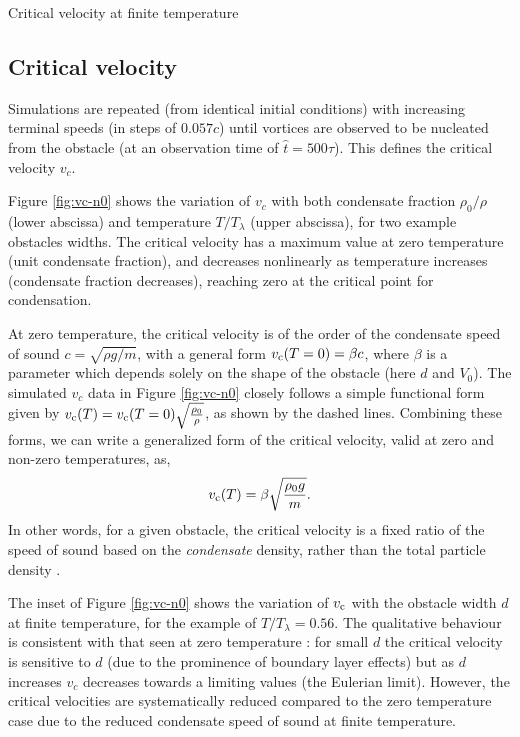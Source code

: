 \begin{chapter}{\label{cha:nonequib}Critical velocity at finite temperature}
  
\subsection{Critical velocity \label{sec:vc}}
Simulations are repeated (from identical initial conditions) with increasing terminal speeds (in steps of $0.057c$) until vortices are observed to be nucleated from the obstacle (at an observation time of $\hat{t}=500\tau$). This defines the critical velocity $v_c$.  



Figure \ref{fig:vc-n0} shows the variation of $v_c$ with both condensate fraction $\rho_0/\rho$ (lower abscissa) and temperature $T/T_\lambda$ (upper abscissa), for two example obstacles widths.  The critical velocity has a maximum value at zero temperature (unit condensate fraction), and decreases nonlinearly as temperature increases (condensate fraction decreases), reaching zero at the critical point for condensation.  

At zero temperature, the critical velocity is of the order of the condensate speed of sound $c=\sqrt{\rho g/m}$, with a general form $v_{\rm c}(T=0)=\beta c$,
where $\beta$ is a parameter which depends solely on the shape of the obstacle (here $d$ and $V_0$).  The simulated $v_c$ data in Figure \ref{fig:vc-n0} closely follows a simple functional form given by $v_{\rm c}(T) = v_{\rm c}(T=0) \sqrt{\frac{\rho_0}{\rho}}$, as shown by the dashed lines.  Combining these forms, we can write a generalized form of the critical velocity, valid at zero and non-zero temperatures, as,
\begin{equation}
v_{\rm c}(T)=\beta \sqrt{\frac{\rho_0 g}{m}}.
\label{eqn:finite_vc}
\end{equation}
In other words, for a given obstacle, the critical velocity is a fixed ratio of the speed of sound based on the {\it condensate} density, rather than the total particle density \cite{leadbeater_2003}.  

The inset of Figure \ref{fig:vc-n0} shows the variation of $v_{\rm c}$ with the obstacle width $d$ at finite temperature, for the example of $T/T_\lambda =0.56$.   The qualitative behaviour is consistent with that seen at zero temperature \cite{huepe00,rica_2001,stagg_2014}: for small $d$ the critical velocity is sensitive to $d$ (due to the prominence of boundary layer effects) but as $d$ increases $v_c$ decreases towards a limiting values (the Eulerian limit).  However, the critical velocities are systematically reduced compared to the zero temperature case due to the reduced condensate speed of sound at finite temperature. 




\end{chapter}
